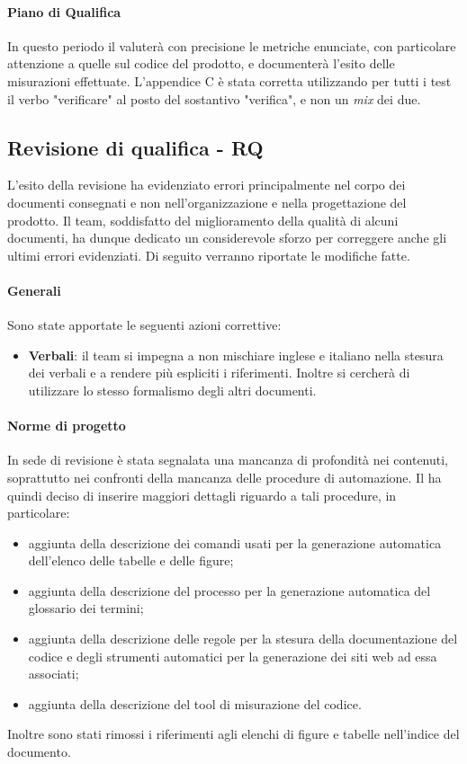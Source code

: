 \paragraph*{Piano di Qualifica}
In questo periodo il  valuterà con precisione le metriche enunciate, con particolare attenzione a quelle sul codice del prodotto, e documenterà l'esito delle misurazioni effettuate. L'appendice C è stata corretta utilizzando per tutti i test il verbo "verificare" al posto del sostantivo "verifica", e non un \textit{mix} dei due.

\subsection{Revisione di qualifica - RQ}
L'esito della revisione ha evidenziato errori principalmente nel corpo dei documenti consegnati e non nell'organizzazione e nella progettazione del prodotto. Il team, soddisfatto del miglioramento della qualità di alcuni documenti, ha dunque dedicato un considerevole sforzo per correggere anche gli ultimi errori evidenziati. Di seguito verranno riportate le modifiche fatte.
\paragraph*{Generali}
Sono state apportate le seguenti azioni correttive:
\begin{itemize}
\item \textbf{Verbali}: il team si impegna a non mischiare inglese e italiano nella stesura dei verbali e a rendere più espliciti i riferimenti. Inoltre si cercherà di utilizzare lo stesso formalismo degli altri documenti.
\end{itemize}

\paragraph*{Norme di progetto}
In sede di revisione è stata segnalata una mancanza di profondità nei contenuti, soprattutto nei confronti della mancanza delle procedure di automazione. Il  ha quindi deciso di inserire maggiori dettagli riguardo a tali procedure, in particolare:
\begin{itemize}
\item aggiunta della descrizione dei comandi usati per la generazione automatica dell'elenco delle tabelle e delle figure;
\item aggiunta della descrizione del processo per la generazione automatica del glossario dei termini;
\item aggiunta della descrizione delle regole per la stesura della documentazione del codice e degli strumenti automatici per la generazione dei siti web ad essa associati;
\item aggiunta della descrizione del tool di misurazione del codice.
\end{itemize}
Inoltre sono stati rimossi i riferimenti agli elenchi di figure e tabelle nell'indice del documento.

